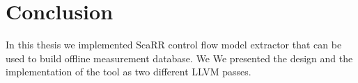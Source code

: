 
\chapter{Conclusion} %

\label{Chapter7} %

In this thesis we implemented ScaRR control flow model extractor that can be used to build offline measurement database. We We presented the design and the implementation of the tool as two different LLVM passes.